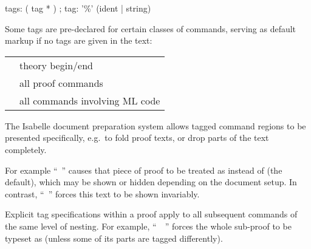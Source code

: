\begin{isabellebody}
\begin{isamarkuptext}
  \begin{rail}
    tags: ( tag * )
    ;
    tag: '\%' (ident | string)
  \end{rail}

  Some tags are pre-declared for certain classes of commands, serving
  as default markup if no tags are given in the text:

  \medskip
  \begin{tabular}{ll}
    \isa{{\isachardoublequote}theory{\isachardoublequote}} & theory begin/end \\
    \isa{{\isachardoublequote}proof{\isachardoublequote}} & all proof commands \\
    \isa{{\isachardoublequote}ML{\isachardoublequote}} & all commands involving ML code \\
  \end{tabular}

  \medskip The Isabelle document preparation system
  \cite{isabelle-sys} allows tagged command regions to be presented
  specifically, e.g.\ to fold proof texts, or drop parts of the text
  completely.

  For example ``\hyperlink{command.by}{\mbox{}}~'' causes
  that piece of proof to be treated as  instead of
   (the default), which may be shown or hidden
  depending on the document setup.  In contrast, ``\hyperlink{command.by}{\mbox{}}~'' forces this text to be shown
  invariably.

  Explicit tag specifications within a proof apply to all subsequent
  commands of the same level of nesting.  For example, ``\hyperlink{command.proof}{\mbox{}}~~\hyperlink{command.qed}{\mbox{}}'' forces the whole
  sub-proof to be typeset as  (unless some of its parts
  are tagged differently).


\end{isamarkuptext}
\end{isabellebody}

